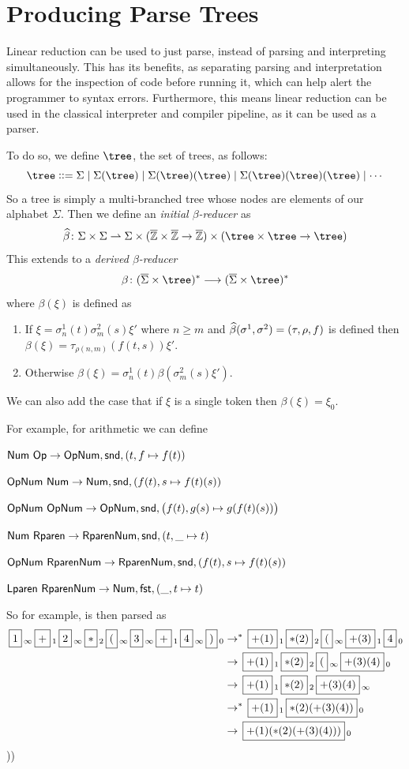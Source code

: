 \documentclass{llncs}
\begin{document}
\section{Producing Parse Trees}

Linear reduction can be used to just parse, instead of parsing and interpreting simultaneously.
This has its benefits, as separating parsing and interpretation allows for the inspection of code before running it, which can help alert the programmer to syntax errors.
Furthermore, this means linear reduction can be used in the classical interpreter and compiler pipeline, as it can be used as a parser.

To do so, we define $\tree$, the set of trees, as follows:
\[ \tree \ccoloneqq \Sigma \gbar \Sigma(\tree) \gbar \Sigma(\tree)(\tree) \gbar \Sigma(\tree)(\tree)(\tree) \gbar \cdots \]
So a tree is simply a multi-branched tree whose nodes are elements of our alphabet $\Sigma$.
Then we define an \textit{initial $\beta$-reducer} as
\[ \hb\colon \Sigma\times\Sigma \partial \Sigma \times (\bbZ\times\bbZ\to\bbZ) \times (\tree\times\tree\to\tree) \]
This extends to a \textit{derived $\beta$-reducer}
\[ \beta\colon (\oS\times\tree)^* \longto (\oS\times\tree)^* \]
where $\beta(\xi)$ is defined as
\begin{enumerate}
    \item If $\xi=\sigma^1_n(t)\sigma^2_m(s)\xi'$ where $n\geq m$ and $\widehat\beta(\sigma^1,\sigma^2)=(\tau,\rho,f)$ is defined then $\beta(\xi)=\tau_{\rho(n,m)}(f(t,s))\xi'$.
    \item Otherwise $\beta(\xi)=\sigma^1_n(t)\beta(\sigma^2_m(s)\xi')$.
\end{enumerate}
We can also add the case that if $\xi$ is a single token then $\beta(\xi)=\xi_0$.

For example, for arithmetic we can define
\blist
    \item $\mathsf{Num}\ \mathsf{Op}\to\mathsf{Op}\mathsf{Num},\mathsf{snd},(t,f\mapsto f(t))$
    \item $\mathsf{Op}\mathsf{Num}\ \mathsf{Num}\to \mathsf{Num},\mathsf{snd},(f(t),s\mapsto f(t)(s))$
    \item $\mathsf{Op}\mathsf{Num}\ \mathsf{Op}\mathsf{Num}\to \mathsf{Op}\mathsf{Num},\mathsf{snd},\bigl(f(t),g(s)\mapsto g(f(t)(s))\bigr)$
    \item $\mathsf{Num}\ \mathsf{Rparen}\to \mathsf{Rparen}\mathsf{Num},\mathsf{snd},(t,\_\mapsto t)$
    \item $\mathsf{Op}\mathsf{Num}\ \mathsf{Rparen}\mathsf{Num}\to \mathsf{Rparen}\mathsf{Num},\mathsf{snd},(f(t),s\mapsto f(t)(s))$
    \item $\mathsf{Lparen}\ \mathsf{Rparen}\mathsf{Num}\to \mathsf{Num},\mathsf{fst},(\_,t\mapsto t)$
\elist

So for example,  is then parsed as
\begin{align*}
    \mb1_\infty \mb+_1 \mb2_\infty \mb*_2 \mb(_\infty \mb3_\infty \mb+_1 \mb4_\infty \mb)_0 &\to^* \mb{+(1)}_1 \mb{*(2)}_2 \mb(_\infty \mb{+(3)}_1 \mb{4}_0\\
    &\to \mb{+(1)}_1 \mb{*(2)}_2 \mb(_\infty \mb{+(3)(4)}_0\\
    &\to \mb{+(1)}_1 \mb{*(2)}_2 \mb{+(3)(4)}_\infty\\
    &\to^* \mb{+(1)}_1 \mb{*(2)(+(3)(4))}_0\\
    &\to \mb{+(1)(*(2)(+(3)(4)))}_0
\end{align*}
\gobble)\gobble)
\end{document}

